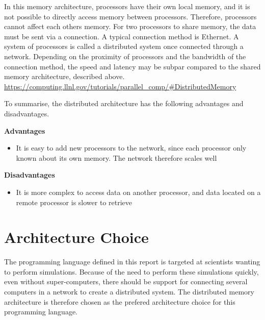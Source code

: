 In this memory architecture, processors have their own local memory, and it is not possible to directly access memory between processors. Therefore, processors cannot affect each others memory. %
For two processors to share memory, the data must be sent via a connection. A typical connection method is Ethernet. A system of processors is called a distributed system once connected through a network. Depending on the proximity of processors and the bandwidth of the connection method, the speed and latency may be subpar compared to the shared memory architecture, described above. \url{https://computing.llnl.gov/tutorials/parallel_comp/#DistributedMemory}

To summarise, the distributed architecture has the following advantages and disadvantages.

\noindent\textbf{Advantages}
\begin{itemize}
    \item It is easy to add new processors to the network, since each processor only known about its own memory. The network therefore scales well
\end{itemize}

\noindent\textbf{Disadvantages}
\begin{itemize}
    \item It is more complex to access data on another processor, and data located on a remote processor is slower to retrieve
\end{itemize}

\section{Architecture Choice}

The programming language defined in this report is targeted at scientists wanting to perform simulations. Because of the need to perform these simulations quickly, even without super-computers, there should be support for connecting several computers in a network to create a distributed system. The distributed memory architecture is therefore chosen as the prefered architecture choice for this programming language.
